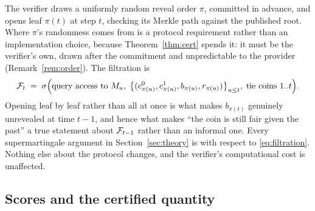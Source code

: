 The verifier draws a uniformly random reveal order $\pi$, committed in advance, and
opens leaf $\pi(t)$ at step $t$, checking its Merkle path against the published root.
Where $\pi$'s randomness comes from is a protocol requirement rather than an
implementation choice, because Theorem~\ref{thm:cert} spends it: it must be the
verifier's own, drawn after the commitment and unpredictable to the provider
(Remark~\ref{rem:order}).
The filtration is
\begin{equation}\label{eq:filtration}
\mathcal{F}_t \;=\; \sigma\Bigl(\text{query access to } M_u,\;
\bigl\{(c_{\pi(u)}^0, c_{\pi(u)}^1, b_{\pi(u)}, r_{\pi(u)})\bigr\}_{u \le t},\;
\text{tie coins } 1..t \Bigr).
\end{equation}
Opening leaf by leaf rather than all at once is what makes $b_{\pi(t)}$ genuinely
unrevealed at time $t-1$, and hence what makes ``the coin is still fair given the
past'' a true statement about $\mathcal{F}_{t-1}$ rather than an informal one. Every
supermartingale argument in Section~\ref{sec:theory} is with respect to
\eqref{eq:filtration}. Nothing else about the protocol changes, and the verifier's
computational cost is unaffected.

\subsection{Scores and the certified quantity}\label{sec:scores}

